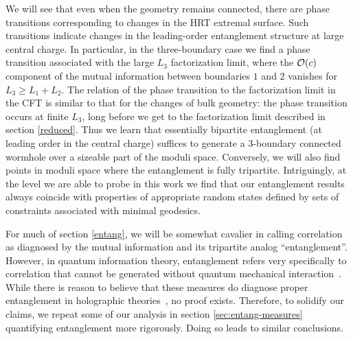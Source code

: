 \documentclass[12pt]{article}
\numberwithin{equation}{section}
\begin{document}
We will see that even when the geometry remains connected, there are phase transitions corresponding to changes in the HRT extremal surface.  Such transitions indicate changes in the  leading-order entanglement structure at large central charge.  In particular, in the three-boundary case we find a phase transition associated with the large $L_3$ factorization limit, where the ${\cal O}(c)$ component of the mutual information between boundaries $1$ and $2$ vanishes for $L_3 \ge L_1 + L_2$.  The relation of the phase transition to the factorization limit in the CFT is similar to that for the changes of bulk geometry: the phase transition occurs at finite $L_3$, long before we get to the factorization limit described in section \ref{reduced}. Thus we learn that essentially bipartite entanglement (at leading order in the central charge) suffices to generate a 3-boundary connected wormhole over a sizeable part of the moduli space.  Conversely, we will also find points in moduli space where the entanglement is fully tripartite.  Intriguingly, at the level we are able to probe in this work we find that our entanglement results always coincide with properties of appropriate random states defined by sets of constraints associated with minimal geodesics.

For much of section \ref{entang}, we will be somewhat cavalier in calling correlation as diagnosed by the mutual information and its tripartite analog ``entanglement''. However, in quantum information theory, entanglement refers very specifically to correlation that cannot be generated without quantum mechanical interaction~\cite{werner1989quantum,bennett1996mixed}. While there is reason to believe that these measures do diagnose proper entanglement in holographic theories~\cite{hayden2013holographic}, no proof exists. Therefore, to solidify our claims, we repeat some of our analysis in section \ref{sec:entang-measures} quantifying entanglement more rigorously. Doing so leads to similar conclusions.
\end{document}
